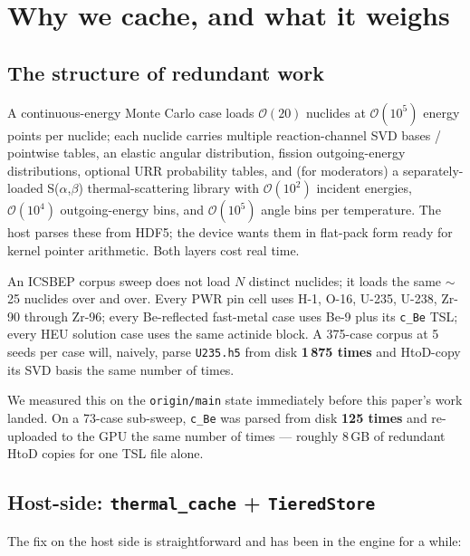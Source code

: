 \section{Why we cache, and what it weighs}
\label{sec:caches}

\subsection{The structure of redundant work}

A continuous-energy Monte Carlo case loads $\mathcal{O}(20)$
nuclides at $\mathcal{O}(10^5)$ energy points per nuclide; each
nuclide carries multiple reaction-channel SVD bases / pointwise
tables, an elastic angular distribution, fission outgoing-energy
distributions, optional URR probability tables, and (for
moderators) a separately-loaded S($\alpha$,$\beta$) thermal-scattering
library with $\mathcal{O}(10^2)$ incident energies, $\mathcal{O}(10^4)$
outgoing-energy bins, and $\mathcal{O}(10^5)$ angle bins per temperature.
The host parses these from HDF5; the device wants them in
flat-pack form ready for kernel pointer arithmetic. Both layers cost
real time.

An ICSBEP corpus sweep does not load $N$ distinct nuclides; it loads
the same $\sim$25 nuclides over and over. Every PWR pin cell uses
H-1, O-16, U-235, U-238, Zr-90 through Zr-96; every Be-reflected
fast-metal case uses Be-9 plus its \texttt{c\_Be} TSL; every HEU
solution case uses the same actinide block. A 375-case corpus at
5 seeds per case will, naively, parse \texttt{U235.h5} from disk
\textbf{1\,875 times} and HtoD-copy its SVD basis the same number
of times.

We measured this on the \texttt{origin/main} state immediately
before this paper's work landed. On a 73-case sub-sweep,
\texttt{c\_Be} was parsed from disk \textbf{125 times} and re-uploaded
to the GPU the same number of times --- roughly 8\,GB of redundant
HtoD copies for one TSL file alone.

\subsection{Host-side: \texttt{thermal\_cache} + \texttt{TieredStore}}

The fix on the host side is straightforward and has been in the
engine for a while:

